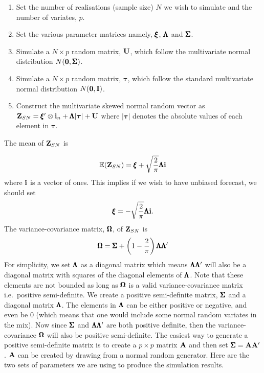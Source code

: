 \documentclass[a4paper, 11pt]{article}
\begin{document}
\begin{enumerate}[{Step} 1.]
    \item Set the number of realisations (sample size) $N$ we wish to simulate and the number of variates, $p$.  
    \item Set the various parameter matrices namely, $\pmb{\xi}$, $\pmb{\Lambda}$ and $\pmb{\Sigma}$. 
    \item Simulate a $N\times p$ random matrix, $\mathbf{U}$, which follow the multivariate normal distribution $N(\mathbf{0}, \pmb{\Sigma})$. 
    \item Simulate a $N\times p$ random matrix, $\boldsymbol \tau$, which follow the standard multivariate normal distribution $N(\mathbf{0}, \mathbf{I})$.  
    \item Construct the multivariate skewed normal random vector as $\mathbf{Z}_{SN} = \pmb{\xi}'\otimes \mathbf{i}_n + \pmb{\Lambda} |\boldsymbol \tau| + \mathbf{U}$ where $|\boldsymbol \tau|$ denotes the absolute values of each element in $\boldsymbol \tau$. 
\end{enumerate}	

\noindent The mean of $\mathbf{Z}_{SN}$ is 

\begin{equation}
    \mathbb{E} (\mathbf{Z}_{SN}) = \pmb{\xi} + \sqrt{\frac{2}{\pi}} \pmb{\Lambda} \mathbf{i}
\end{equation}
\noindent where $\mathbf{i}$ is a vector of ones. This implies if we wish to have unbiased forecast, we should set 
\begin{equation} 
    \pmb{\xi} = -\sqrt{\frac{2}{\pi}} \pmb{\Lambda} \mathbf{i}. 
\end{equation}
\noindent The variance-covariance matrix, $\pmb{\Omega}$, of $\mathbf{Z}_{SN}$ is 
\begin{equation}
    \pmb{\Omega} = \pmb{\Sigma} + \left ( 1 - \frac{2}{\pi} \right ) \pmb{\Lambda} \pmb{\Lambda}'
\end{equation} 
\noindent For simplicity, we set $\pmb{\Lambda}$ as a diagonal matrix which means $\pmb{\Lambda}\pmb{\Lambda}'$ will also be a diagonal matrix with squares of the diagonal elements of $\pmb{\Lambda}$. Note that these elements are not bounded as long as $\pmb{\Omega}$ is a valid variance-covariance matrix i.e.~positive semi-definite. We create a positive semi-definite matrix, $\pmb{\Sigma}$ and a diagonal matrix $\pmb{\Lambda}$. The elements in $\pmb{\Lambda}$ can be either positive or negative, and even be 0 (which means that one would include some normal random variates in the mix). Now since $\pmb{\Sigma}$ and $\pmb{\Lambda}\pmb{\Lambda}'$ are both positive definite, then the variance-covariance $\pmb{\Omega}$ will also be positive semi-definite. The easiest way to generate a positive semi-definite matrix is to create a $p\times p$ matrix $\mathbf{A}$ and then set $\pmb{\Sigma} = \mathbf{A}\mathbf{A}'$. $\mathbf{A}$ can be created by drawing from a normal random generator. Here are the two sets of parameters we are using to produce the simulation results.\par
\end{document}

